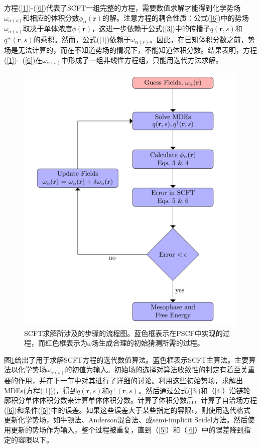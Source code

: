 \documentclass[12pt,a4paper]{article}
\begin{document}
方程(\ref{1})-(\ref{6})代表了SCFT一组完整的方程，需要数值求解才能得到化学势场$\omega_{\alpha(s)}$和相应的体积分数$\phi_{\alpha}(\mathbf{r})$的解。注意方程的耦合性质：公式(\ref{6})中的势场$\omega_{\alpha(s)}$取决于单体浓度$\phi(\mathbf{r})$，这进一步依赖于公式(\ref{3})中的传播子$q(\mathbf{r},s)$和$q^{+}(\mathbf{r},s)$的乘积。然而，公式(\ref{1})依赖于$\omega_{\alpha (s)}$。因此，在已知体积分数之前，势场是无法计算的，而在不知道势场的情况下，不能知道体积分数。结果表明，方程(\ref{1})−(\ref{6})在$\omega_{\alpha (s)}$中形成了一组非线性方程组，只能用迭代方法求解。
\begin{figure}[H]
	\centering
	\includegraphics[scale=0.5]{./figures/21.png}
	\caption{SCFT求解所涉及的步骤的流程图。蓝色框表示在PSCF中实现的过程，而红色框表示为$\omega$场生成合理的初始猜测所需的过程。}
	\label{figure21}
\end{figure}
图\ref{figure21}给出了用于求解SCFT方程的迭代数值算法。蓝色框表示SCFT主算法。主要算法以化学势场$\omega_{\alpha (s)}$的初值为输入。初始场的选择对算法收敛性的判定有着至关重要的作用，并在下一节中对其进行了详细的讨论。利用这些初始势场，求解出MDEs(方程(\ref{1}))，得到$q(\mathbf{r},s)$和$q^{+}(\mathbf{r},s)$。然后通过公式(\ref{3})和（\ref{4}）沿链轮廓积分单体体积分数来计算单体体积分数。计算了体积分数后，计算了自洽场方程(\ref{6})和条件(\ref{5})中的误差。如果这些误差大于某些指定的容限$\epsilon$，则使用迭代格式更新化学势场，如牛顿法、Anderson混合法、或semi-implicit Seidel方法。然后使用更新的势场作为输入，整个过程被重复，直到（\ref{5}）和（\ref{6}）中的误差降到指定的容限以下。
\end{document}
